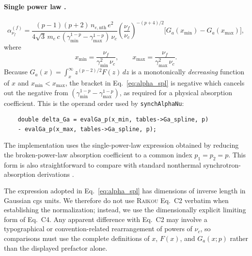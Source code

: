 \documentclass[12pt,a4paper]{article}
\newcommand{\nuf}{\nu_{\!f}}
\newcommand{\nuc}{\nu_c}
\newcommand{\gmin}{\gamma_{\min}}
\newcommand{\gmax}{\gamma_{\max}}
\newcommand{\nenth}{n_{e,\mathrm{nth}}}
\newcommand{\code}[1]{\texttt{#1}}
\newcommand{\raikou}{\textsc{Raikou}}
\begin{document}
\paragraph{Single power law \citep[\raikou{} Eq.~C2]{kawashima2023}.}
\begin{equation}
	\alpha_{\nuf}^{(f)} =
	\frac{(p-1)(p+2)\,\nenth\,e^2}
	{4\sqrt{3}\,m_e\,c\,(\gmin^{1-p} - \gmax^{1-p})\,\nuc}
	\left(\frac{\nuf}{\nuc}\right)^{-(p+4)/2}
	\bigl[G_a(x_{\min}) - G_a(x_{\max})\bigr],
	\label{eq:alpha_spl}
\end{equation}
where
\begin{equation}
	x_{\min} = \frac{\nuf}{\gmin^2\,\nuc}, \qquad
	x_{\max} = \frac{\nuf}{\gmax^2\,\nuc}.
	\label{eq:x_limits_spl}
\end{equation}
Because $G_a(x)=\int_x^\infty z^{(p-2)/2}F(z)\,dz$ is a monotonically
\emph{decreasing} function of $x$ and $x_{\min} < x_{\max}$, the bracket
in Eq.~\eqref{eq:alpha_spl} is negative which cancels out the negative from $(\gmin^{1-p} - \gmax^{1-p})$, as required for a physical
absorption coefficient. This is the operand order used by
\code{synchAlphaNu}:
\begin{verbatim}
	double delta_Ga = evalGa_p(x_min, tables->Ga_spline, p)
	- evalGa_p(x_max, tables->Ga_spline, p);
\end{verbatim}

The implementation uses the single-power-law expression obtained by
reducing the broken-power-law absorption coefficient
\citep[\raikou{} Eq.~C4]{kawashima2023} to a common index
$p_1=p_2=p$. This form is also straightforward to compare with standard
nonthermal synchrotron-absorption derivations
\citep[e.g.][]{dexter2012}.

The expression adopted in Eq.~\eqref{eq:alpha_spl} has dimensions of
inverse length in Gaussian cgs units. We therefore do not use
\raikou{} Eq.~C2 verbatim when establishing the normalization; instead,
we use the dimensionally explicit limiting form of Eq.~C4. Any apparent
difference with Eq.~C2 may involve a typographical or convention-related
rearrangement of powers of $\nu_c$, so comparisons must use the complete
definitions of $x$, $F(x)$, and $G_a(x;p)$ rather than the displayed
prefactor alone.
\end{document}
